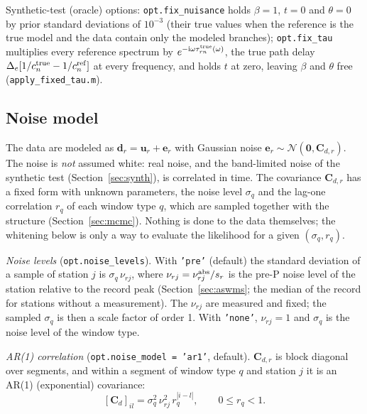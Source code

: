 \documentclass[11pt]{article}
\newcommand{\ii}{\mathrm{i}}
\begin{document}
Synthetic-test (oracle) options: \texttt{opt.fix\_nuisance} holds $\beta=1$,
$t=0$ and $\theta=0$ by prior standard deviations of $10^{-3}$ (their true
values when the reference is the true model and the data contain only the
modeled branches); \texttt{opt.fix\_tau} multiplies every reference
spectrum by $e^{-\ii\omega\tau^{\rm true}_{rn}(\omega)}$, the true path
delay $\Delta_e[1/c^{\rm true}_n-1/c^{\rm ref}_n]$ at every frequency, and
holds $t$ at zero, leaving $\beta$ and $\theta$ free
(\texttt{apply\_fixed\_tau.m}).

\subsection{Noise model}\label{sec:noise}
The data are modeled as $\mathbf{d}_r=\mathbf{u}_r+\mathbf{e}_r$ with
Gaussian noise $\mathbf{e}_r\sim\mathcal{N}(\mathbf{0},\mathbf{C}_{d,r})$.
The noise is \emph{not} assumed white: real noise, and the band-limited
noise of the synthetic test (Section~\ref{sec:synth}), is correlated in
time. The covariance $\mathbf{C}_{d,r}$ has a fixed form with unknown
parameters, the noise level $\sigma_q$ and the lag-one correlation $r_q$ of
each window type $q$, which are sampled together with the structure
(Section~\ref{sec:mcmc}). Nothing is done to the data themselves; the
whitening below is only a way to evaluate the likelihood for a given
$(\sigma_q,r_q)$.

\emph{Noise levels} (\texttt{opt.noise\_levels}). With \texttt{'pre'}
(default) the standard deviation of a sample of station $j$ is
$\sigma_q\,\nu_{rj}$, where $\nu_{rj}=\nu^{\rm abs}_{rj}/s_r$ is the pre-P
noise level of the station relative to the record peak
(Section~\ref{sec:aswms}; the median of the record for stations without a
measurement). The $\nu_{rj}$ are measured and fixed; the sampled $\sigma_q$
is then a scale factor of order 1. With \texttt{'none'}, $\nu_{rj}=1$ and
$\sigma_q$ is the noise level of the window type.

\emph{AR(1) correlation} (\texttt{opt.noise\_model = 'ar1'}, default).
$\mathbf{C}_{d,r}$ is block diagonal over segments, and within a segment of
window type $q$ and station $j$ it is an AR(1) (exponential) covariance:
\begin{equation}\label{eq:Cd}
 [\mathbf{C}_{d}]_{il}=\sigma_q^2\,\nu_{rj}^2\,r_q^{|i-l|},\qquad 0\le r_q<1 .
\end{equation}
\end{document}
